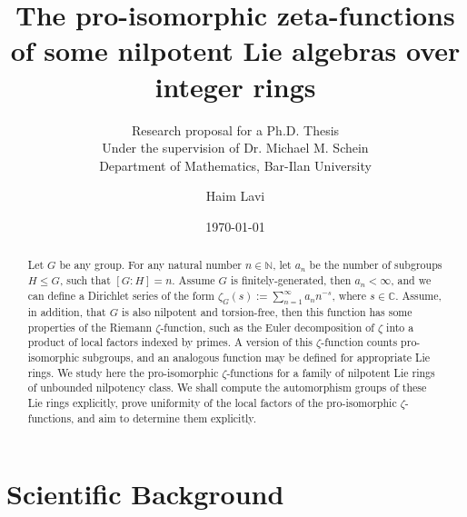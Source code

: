 \documentclass[12pt]{article}
\title{The pro-isomorphic zeta-functions of some nilpotent Lie algebras over integer rings}
\subtitle{Research proposal for a Ph.D. Thesis\\
Under the supervision of Dr. Michael M. Schein\\
Department of Mathematics, Bar-Ilan University}
\author{Haim Lavi}
\date{\today}
\begin{document}
\maketitle
\tableofcontents
\newpage
\begin{abstract}
Let $G$ be any group. For any natural number $n\in\mathbb{N}$, let $a_n$ be the number of subgroups $H\leq G$, such that $[G:H]=n$. Assume $G$ is finitely-generated, then $a_n<\infty$, and we can define a Dirichlet series of the form $\zeta_G(s):=\sum_{n=1}^\infty a_n n^{-s}$, where $s\in\mathbb{C}$. Assume, in addition, that $G$ is also nilpotent and torsion-free, then this function has some properties of the Riemann $\zeta$-function, such as the Euler decomposition of $\zeta$ into a product of local factors indexed by primes. A version of this $\zeta$-function counts pro-isomorphic subgroups, and an analogous function may be defined for appropriate Lie rings. We study here the pro-isomorphic $\zeta$-functions for a family of nilpotent Lie rings of unbounded nilpotency class. We shall compute the automorphism groups of these Lie rings explicitly, prove uniformity of the local factors of the pro-isomorphic $\zeta$-functions, and aim to determine them explicitly.
\end{abstract}
\section{Scientific Background}
\end{document}
